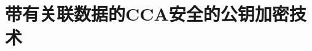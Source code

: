 \section{带有关联数据的CCA安全的公钥加密技术}\label{sec:12-7}

\begin{definition}\label{def:12-7}
	
\end{definition}
